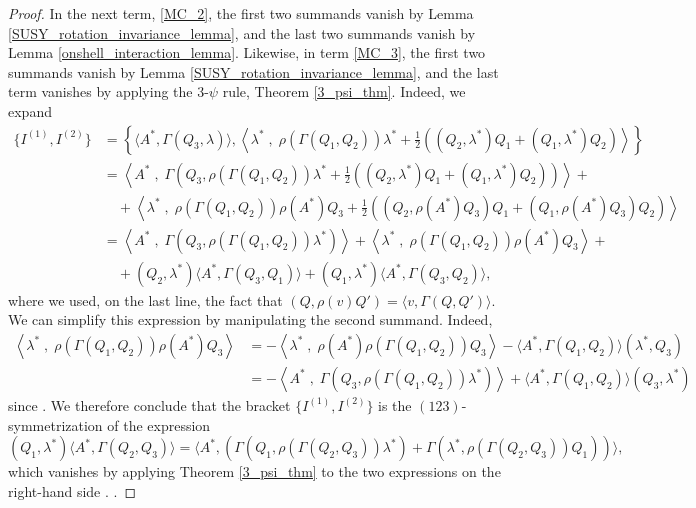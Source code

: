 \documentclass[10pt, oneside]{article}
\begin{document}
\begin{proof}
In the next term, \ref{MC_2}, the first two summands vanish by Lemma \ref{SUSY_rotation_invariance_lemma}, and the last two summands vanish by Lemma \ref{onshell_interaction_lemma}.  Likewise, in term \ref{MC_3}, the first two summands vanish by Lemma \ref{SUSY_rotation_invariance_lemma}, and the last term vanishes by applying the 3-$\psi$ rule, Theorem \ref{3_psi_thm}.  Indeed, we expand
\begin{align*}
 \{I^{(1)}, I^{(2)}\}  &= \left\{\langle A^* , \Gamma(Q_3, \lambda)\rangle, \left\langle\lambda^* \;,\; \rho(\Gamma(Q_1,Q_2)) \lambda^* + \frac 12 \left((Q_2, \lambda^*)Q_1 + (Q_1, \lambda^*)Q_2\right)\right\rangle\right\}\\
 &= \left\langle A^*\;,\; \Gamma\left(Q_3, \rho(\Gamma(Q_1,Q_2)) \lambda^* + \frac 12 \left((Q_2, \lambda^*)Q_1 + (Q_1, \lambda^*)Q_2\right)\right)\right\rangle + \\
 &\quad + \left\langle\lambda^* \;,\; \rho(\Gamma(Q_1,Q_2))\rho(A^*)Q_3 + \frac 12 \left( (Q_2, \rho(A^*)Q_3)Q_1 + (Q_1, \rho(A^*)Q_3)Q_2 \right)\right\rangle \\
 &= \left\langle A^*\;,\; \Gamma\left(Q_3, \rho(\Gamma(Q_1,Q_2)) \lambda^*\right)\right\rangle +  \left\langle\lambda^* \;,\; \rho(\Gamma(Q_1,Q_2))\rho(A^*)Q_3\right\rangle + \\
 &\quad + (Q_2, \lambda^*)\langle A^*, \Gamma(Q_3, Q_1)\rangle + (Q_1, \lambda^*)\langle A^*, \Gamma(Q_3, Q_2)\rangle,
\end{align*}
where we used, on the last line, the fact that $(Q, \rho(v)Q') = \langle v, \Gamma(Q, Q')\rangle$.  We can simplify this expression by manipulating the second summand.  Indeed,
\begin{align*}
\left\langle\lambda^* \;,\; \rho(\Gamma(Q_1,Q_2))\rho(A^*)Q_3\right\rangle &= - \left\langle\lambda^* \;,\; \rho(A^*)\rho(\Gamma(Q_1,Q_2))Q_3\right\rangle - \langle A^*, \Gamma(Q_1,Q_2) \rangle (\lambda^*, Q_3) \\
&= - \left\langle A^*\;,\; \Gamma\left(Q_3, \rho(\Gamma(Q_1,Q_2)) \lambda^* \right)\right\rangle + \langle A^*, \Gamma(Q_1,Q_2) \rangle (Q_3, \lambda^*)
\end{align*}
since .
We therefore conclude that the bracket $\{I^{(1)}, I^{(2)}\}$ is the $(123)$-symmetrization of the expression 
\[(Q_1, \lambda^*)\langle A^*, \Gamma(Q_2, Q_3)\rangle = \langle A^*, (\Gamma(Q_1,\rho(\Gamma(Q_2,Q_3))\lambda^*) + \Gamma(\lambda^*,\rho(\Gamma(Q_2,Q_3))Q_1))\rangle,\]
which vanishes by applying Theorem \ref{3_psi_thm} to the two expressions on the right-hand side .
.


\end{proof}
\end{document}
